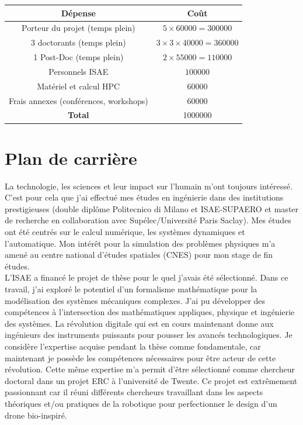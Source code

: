 \documentclass[12pt, french]{article}
\begin{document}
\begin{center}
\begin{tabular}{|c|c|}
	\hline
	D\'epense & Co\^{u}t \\
	\hline
	Porteur du projet (temps plein) & $5\times 60000=300000$ \\
	3 doctorants (temps plein) & $3\times 3\times 40000=360000$  \\
	1 Post-Doc (temps plein) & $2\times 55000=110000$ \\
	Personnels ISAE & $100000$ \\
	Matériel  et calcul HPC & $60000$ \\
	Frais annexes (conférences, workshops) & $60000$ \\
	\hline
	\textbf{Total} & 1000000 \\
	\hline
\end{tabular}
\end{center}






\section{Plan de carrière}

La technologie, les sciences et leur impact sur l'humain m'ont toujours intéressé. C'est pour cela que j'ai effectué mes études en ingénierie dans des institutions prestigieuses (double diplôme Politecnico di Milano et ISAE-SUPAERO et master de recherche en collaboration avec Supélec/Université Paris Saclay). Mes études ont été centrés sur le calcul numérique, les systèmes dynamiques et l'automatique. Mon intérêt pour la simulation des problèmes physiques m'a amené au centre national d'études spatiales (CNES) pour mon stage de fin études. \\

L'ISAE a financé le projet de thèse pour le quel j'avais été sélectionné. Dans ce travail, j'ai exploré le potentiel d'un formalisme mathématique pour la modélisation des systèmes mécaniques complexes. J'ai pu développer des compétences à l'intersection des mathématiques appliques, physique et ingénierie des systèmes. La révolution digitale qui est en cours maintenant donne aux ingénieurs des instruments puissants pour pousser les avancés technologiques. Je considère l'expertise acquise pendant la thèse comme fondamentale, car maintenant je possède les compétences nécessaires pour être acteur de cette révolution. Cette même expertise m'a permit d'être sélectionné comme chercheur doctoral dans un projet ERC à l'université de Twente. Ce projet est extrêmement passionnant car il réuni différents chercheurs travaillant dans les aspects théoriques et/ou pratiques de la robotique pour perfectionner le design d'un drone bio-inspiré. \\
\end{document}
